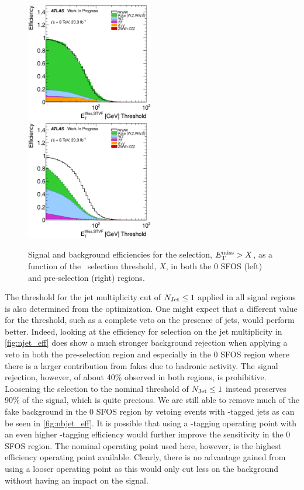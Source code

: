 \begin{figure}[ht!]
\centering
\includegraphics[width=0.495\textwidth]{figures/optimization/SignalRegionsPreselection_0SFOS_Efficiencies/MET_Et_STVF_Cumulative.eps}
\includegraphics[width=0.495\textwidth]{figures/optimization/SignalRegions_0p5mmZ0_Preselection_Efficiencies/MET_Et_STVF_Cumulative.eps}
\caption{ Signal and background efficiencies for the 
selection, $E_{\mathrm{T}}^{\mathrm{miss}} > X$, as a function of the \MET~selection
threshold, $X$,  in both the 0 SFOS (left) and pre-selection (right) regions.  }
\label{fig:met_eff}
\end{figure}

The threshold for the jet multiplicity cut 
of $N_{\textrm{Jet}}\leq 1$ applied in all signal regions
is also determined from the optimization. One might expect
that a different value for the threshold, such as a complete
veto on the presence of jets, would perform better. 
Indeed, looking at the efficiency for selection on the jet multiplicity
in \fig\ref{fig:njet_eff} does show a much stronger background
rejection when applying a veto in both the pre-selection region
and especially in the 0 SFOS region where there is a larger
contribution from fakes due to hadronic activity.
The signal rejection, however,  of about 40\% observed in both
regions, is prohibitive. Loosening the selection to the nominal
threshold of $N_{\textrm{Jet}} \leq 1$ instead preserves 90\% of the signal, 
which is quite precious.  We are still able to remove 
much of the fake background in the 0 SFOS region by vetoing
events with \bee-tagged jets as can be seen in \fig\ref{fig:nbjet_eff}.
It is possible that using a \bee-tagging operating point
with an even higher \bee-tagging efficiency would further 
improve the sensitivity in the 0 SFOS region.  
The nominal operating point used here, however,  is the highest 
efficiency operating point available.
Clearly, there is no advantage gained from using a looser operating point
as this would only cut less on the background without having an impact
on the signal.



